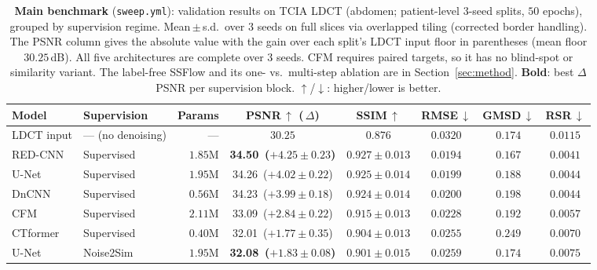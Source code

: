 \documentclass[letterpaper]{article} %
\begin{document}
\begin{table}[t]
  \centering
  \small
  \caption{\textbf{Main benchmark} (\texttt{sweep.yml}): validation results on
           TCIA LDCT (abdomen; patient-level $3$-seed splits, $50$ epochs),
           grouped by supervision regime.  Mean\,$\pm$\,s.d.\ over $3$ seeds on
           full slices via overlapped tiling (corrected border handling).  The
           PSNR column gives the absolute value with the gain over each split's
           LDCT input floor in parentheses (mean floor $30.25$\,dB).  All
           five architectures are complete over $3$ seeds.  CFM requires paired
           targets, so it has no blind-spot or similarity variant.  The
           label-free SSFlow and its one- vs.\ multi-step ablation are in
           Section~\ref{sec:method}.  \textbf{Bold}: best $\Delta$PSNR per
           supervision block.  $\uparrow$/$\downarrow$: higher/lower is better.}
  \label{tab:results}
  \begin{tabular}{llrccccc}
    \toprule
    \textbf{Model} & \textbf{Supervision} & \textbf{Params} &
    PSNR\,$\uparrow$ (\,$\Delta$) & SSIM\,$\uparrow$ & RMSE\,$\downarrow$ &
    GMSD\,$\downarrow$ & RSR\,$\downarrow$ \\
    \midrule
    LDCT input & --- (no denoising) & --- & $30.25$ & $0.876$ & $0.0320$ & $0.174$ & $0.0115$ \\
    \midrule
    RED-CNN~\cite{chen2017lowdose}   & Supervised & $1.85\mathrm{M}$ & \textbf{34.50 \,($+4.25{\pm}0.23$)} & $0.927{\pm}0.013$ & $0.0194$ & $0.167$ & $0.0041$ \\
    U-Net                            & Supervised & $1.95\mathrm{M}$ & 34.26 \,($+4.02{\pm}0.22$) & $0.925{\pm}0.014$ & $0.0199$ & $0.188$ & $0.0044$ \\
    DnCNN~\cite{zhang2017beyond}     & Supervised & $0.56\mathrm{M}$ & 34.23 \,($+3.99{\pm}0.18$) & $0.924{\pm}0.014$ & $0.0200$ & $0.198$ & $0.0044$ \\
    CFM~\cite{lipman2022flow}        & Supervised & $2.11\mathrm{M}$ & 33.09 \,($+2.84{\pm}0.22$) & $0.915{\pm}0.013$ & $0.0228$ & $0.192$ & $0.0057$ \\
    CTformer~\cite{wang2022ctformer} & Supervised & $0.40\mathrm{M}$ & 32.01 \,($+1.77{\pm}0.35$) & $0.904{\pm}0.013$ & $0.0255$ & $0.249$ & $0.0070$ \\
    \midrule
    U-Net                            & Noise2Sim~\cite{niu2020noise2sim} & $1.95\mathrm{M}$ & \textbf{32.08 \,($+1.83{\pm}0.08$)} & $0.901{\pm}0.015$ & $0.0259$ & $0.174$ & $0.0075$ \\

\end{tabular}
\end{table}
\end{document}
